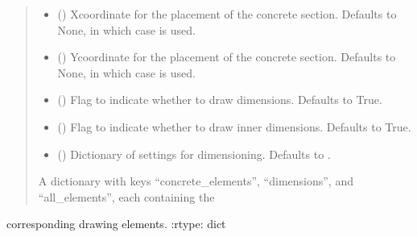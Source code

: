 \documentclass[a4paper,10pt,english]{sphinxmanual}
\begin{document}
\begin{fulllineitems}
\begin{fulllineitems}
\begin{quote}
\begin{description}
\begin{itemize}
\item {} 
\sphinxAtStartPar
{} (\sphinxstyleliteralemphasis{\sphinxupquote{, }}) \textendash{} X\sphinxhyphen{}coordinate for the placement of the concrete section. Defaults to None, in which case  is
used.

\item {} 
\sphinxAtStartPar
{} (\sphinxstyleliteralemphasis{\sphinxupquote{, }}) \textendash{} Y\sphinxhyphen{}coordinate for the placement of the concrete section. Defaults to None, in which case  is
used.

\item {} 
\sphinxAtStartPar
{} (\sphinxstyleliteralemphasis{\sphinxupquote{, }}) \textendash{} Flag to indicate whether to draw dimensions. Defaults to True.

\item {} 
\sphinxAtStartPar
{} (\sphinxstyleliteralemphasis{\sphinxupquote{, }}) \textendash{} Flag to indicate whether to draw inner dimensions. Defaults to True.

\item {} 
\sphinxAtStartPar
{} (\sphinxstyleliteralemphasis{\sphinxupquote{, }}) \textendash{} Dictionary of settings for dimensioning. Defaults to .

\end{itemize}

\sphinxAtStartPar
A dictionary with keys “concrete\_elements”, “dimensions”, and “all\_elements”, each containing the

\end{description}\end{quote}

\sphinxAtStartPar
corresponding drawing elements.
:rtype: dict


\end{fulllineitems}
\end{fulllineitems}
\end{document}
